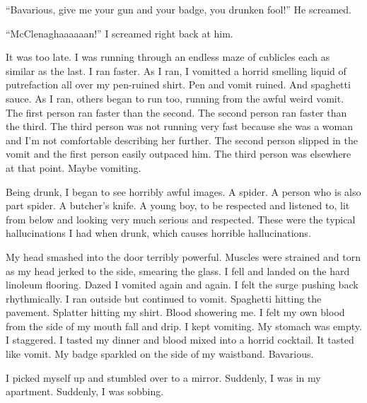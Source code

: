 ``Bavarious, give me your gun and your badge, you drunken fool!'' He
screamed.

``McClenaghaaaaaan!'' I screamed right back at him.

It was too late. I was running through an endless maze of cublicles
each as similar as the last. I ran faster. As I ran, I vomitted a
horrid smelling liquid of putrefaction all over my pen-ruined
shirt. Pen and vomit ruined. And spaghetti sauce. As I ran, others
began to run too, running from the awful weird vomit. The first
person ran faster than the second. The second person ran faster
than the third. The third person was not running very fast because
she was a woman and I'm not comfortable describing her further. The
second person slipped in the vomit and the first person easily
outpaced him. The third person was elsewhere at that point. Maybe
vomiting.

Being drunk, I began to see horribly awful images. A spider. A
person who is also part spider. A butcher's knife. A young boy, to
be respected and listened to, lit from below and looking very much
serious and respected. These were the typical hallucinations I had
when drunk, which causes horrible hallucinations.

My head smashed into the door terribly powerful. Muscles were
strained and torn as my head jerked to the side, smearing the
glass. I fell and landed on the hard linoleum flooring. Dazed I
vomited again and again. I felt the surge pushing back
rhythmically. I ran outside but continued to vomit. Spaghetti
hitting the pavement. Splatter hitting my shirt. Blood showering
me. I felt my own blood from the side of my mouth fall and drip. I
kept vomiting. My stomach was empty. I staggered. I tasted my
dinner and blood mixed into a horrid cocktail. It tasted like
vomit. My badge sparkled on the side of my waistband.
Bavarious.

I picked myself up and stumbled over to a mirror. Suddenly, I was
in my apartment. Suddenly, I was sobbing. 

 



